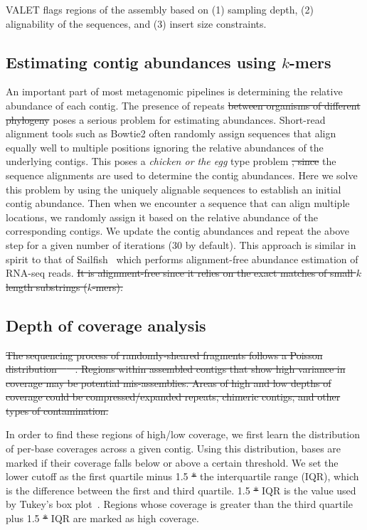\documentclass[12pt,\mydriver]{thesis}
\providecommand{\DIFaddtex}[1]{{\protect\color{blue}\uwave{#1}}} %
\providecommand{\DIFdeltex}[1]{{\protect\color{red}\sout{#1}}}                      %
\providecommand{\DIFaddbegin}{} %
\providecommand{\DIFaddend}{} %
\providecommand{\DIFdelbegin}{} %
\providecommand{\DIFdelend}{} %
\providecommand{\DIFadd}[1]{\texorpdfstring{\DIFaddtex{#1}}{#1}} %
\providecommand{\DIFdel}[1]{\texorpdfstring{\DIFdeltex{#1}}{}} %
\begin{document}
\DIFaddend VALET flags regions of the assembly based on (1) sampling depth, (2) alignability of the sequences, and (3) insert size constraints.

\subsection{Estimating contig abundances using $k$-mers}

An important part of most metagenomic pipelines is determining the relative abundance of each contig.
The presence of repeats \DIFdelbegin \DIFdel{between organisms of different phylogeny }\DIFdelend \DIFaddbegin \DIFadd{among different species }\DIFaddend poses a serious problem for estimating abundances.
Short-read alignment tools such as Bowtie2 often randomly assign sequences that align equally well to multiple positions ignoring the relative abundances of the underlying contigs.
This poses a \emph{chicken or the egg} type problem \DIFdelbegin \DIFdel{, since }\DIFdelend \DIFaddbegin \DIFadd{because }\DIFaddend the sequence alignments are used to determine the contig abundances.
Here we solve this problem by using the uniquely alignable sequences to establish an initial contig abundance.
Then when we encounter a sequence that can align multiple locations, we randomly assign it based on the relative abundance of the corresponding contigs.
We update the contig abundances and repeat the above step for a given number of iterations (30 by default).
This approach is similar in spirit to that of Sailfish~\cite{patro2014sailfish} which performs alignment-free abundance estimation of RNA-seq reads.
\DIFdelbegin \DIFdel{It is alignment-free since it relies on the exact matches of small $k$ length substrings ($k$-mers).
}\DIFdelend 

\subsection{Depth of coverage analysis}
\DIFdelbegin \DIFdel{The sequencing process of randomly-sheared fragments follows a Poisson distribution~\mbox{%
\cite{lander1988genomic}
}%
.  Regions within assembled contigs that show high variance in coverage may be potential mis-assemblies.  Areas of high and low depths of coverage could be compressed/expanded repeats, chimeric contigs, and other types of contamination.
}\DIFdelend 

In order to find these regions of high/low coverage, we first learn the distribution of per-base coverages across a given contig.  Using this distribution, bases are marked if their coverage falls below or above a certain threshold.  We set the lower cutoff as the first quartile minus 1.5 \DIFdelbegin \DIFdel{* }\DIFdelend \DIFaddbegin \DIFadd{$\times$ }\DIFaddend the interquartile range (IQR), which is the difference between the first and third quartile. 1.5 \DIFdelbegin \DIFdel{* }\DIFdelend \DIFaddbegin \DIFadd{$\times$ }\DIFaddend IQR is the value used by Tukey’s box plot~\cite{mcgill1978variations}.  Regions whose coverage is greater than the third quartile plus 1.5 \DIFdelbegin \DIFdel{* }\DIFdelend \DIFaddbegin \DIFadd{$\times$ }\DIFaddend IQR are marked as high coverage.
\end{document}
